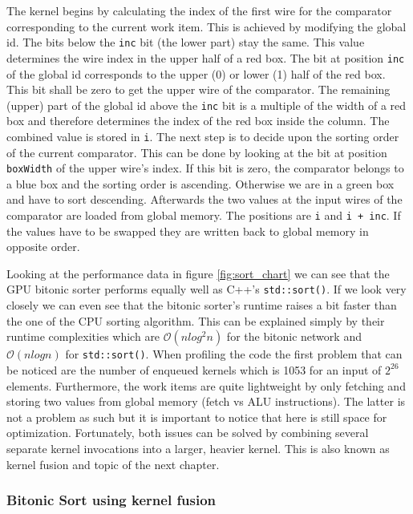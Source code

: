 The kernel begins by calculating the index of the first wire for the comparator corresponding to the current work item. This is achieved by modifying the global id. The bits below the \lstinline!inc! bit (the lower part) stay the same. This value determines the wire index in the upper half of a red box. The bit at position \lstinline!inc! of the global id corresponds to the upper (0) or lower (1) half of the red box. This bit shall be zero to get the upper wire of the comparator. The remaining (upper) part of the global id above the \lstinline!inc! bit is a multiple of the width of a red box and therefore determines the index of the red box inside the column. The combined value is stored in \lstinline!i!.
The next step is to decide upon the sorting order of the current comparator. This can be done by looking at the bit at position \lstinline!boxWidth! of the upper wire's index. If this bit is zero, the comparator belongs to a blue box and the sorting order is ascending. Otherwise we are in a green box and have to sort descending.
Afterwards the two values at the input wires of the comparator are loaded from global memory. The positions are \lstinline!i! and \lstinline!i + inc!. If the values have to be swapped they are written back to global memory in opposite order.

Looking at the performance data in figure \ref{fig:sort_chart} we can see that the GPU bitonic sorter performs equally well as C++'s \lstinline!std::sort()!. If we look very closely we can even see that the bitonic sorter's runtime raises a bit faster than the one of the CPU sorting algorithm. This can be explained simply by their runtime complexities which are $\mathcal{O}(n log^2 n)$ for the bitonic network and $\mathcal{O}(n log n)$ for \lstinline!std::sort()!.
When profiling the code the first problem that can be noticed are the number of enqueued kernels which is 1053 for an input of $2^{26}$ elements. Furthermore, the work items are quite lightweight by only fetching and storing two values from global memory (fetch vs ALU instructions). The latter is not a problem as such but it is important to notice that here is still space for optimization. Fortunately, both issues can be solved by combining several separate kernel invocations into a larger, heavier kernel. This is also known as kernel fusion and topic of the next chapter.


\subsubsection{Bitonic Sort using kernel fusion}



